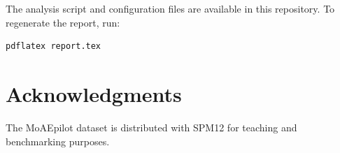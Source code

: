 \documentclass[11pt,a4paper]{article}
\begin{document}
\noindent
The analysis script and configuration files are available in this repository. To regenerate the report, run:

\begin{verbatim}
pdflatex report.tex
\end{verbatim}

\section*{Acknowledgments}
The MoAEpilot dataset is distributed with SPM12 for teaching and benchmarking purposes.
\end{document}
